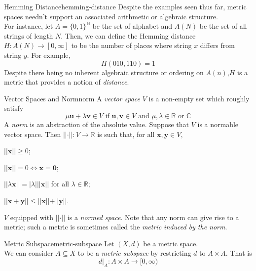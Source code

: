 \documentclass{article}
\renewcommand*\vec{\mathbf}
\numberwithin{equation}{section}
\numberwithin{figure}{section}
\newcommand*\setaxiomprefix[1]{
    \setlist[axioms]{label=#1\arabic*), ref=#1\arabic*}
}
\begin{document}
\begin{example}{Hemming Distance}{hemming-distance}
    Despite the examples seen thus far, metric spaces needn't support an
    associated arithmetic or algebraic structure.\\ For instance, let $ A =
    \{ 0, 1 \}^\mathbb{N} $ be the set of alphabet and $ A(N)$ be the set of all strings of length $N$. Then, we can define the Hemming distance $H : A(N) \rightarrow [0,\infty]$ to be the number of places where string $x$ differs from string $y$. For example,
    \begin{equation}
        H(010,110)=1
    \end{equation}
    Despite there being no inherent algebraic structure or ordering on $A(n)$,$H$ is a metric that provides a notion of \emph{distance}.
\end{example}
\begin{definition}{Vector Spaces and Norm}{norm}
    A \emph{vector space} $ V $ is a non-empty set which roughly satisfy 
    \begin{equation}
        \mu\vec{u} +\lambda\vec{v}\in V \text{ if } \vec{u},\vec{v} \in V \text{ and } \mu,\lambda\in \mathbb{R} \text{ or } \mathbb{C} 
    \end{equation}
    A \emph{norm} is an abstraction of the absolute value. Suppose that $ V $ is
    a normable vector space. Then $ \vert\vert\cdot\vert\vert \colon V \to
    \mathbb{R} $ is such that, for all $ \vec{x}, \vec{y} \in V $,
    \setaxiomprefix{N}
    \begin{axioms}
        \item $ \vert\vert \vec{x} \vert\vert \geq 0 $;
        \item $ \vert\vert \vec{x} \vert\vert = 0 \iff \vec{x} = \vec{0} $;
        \item $ \vert\vert \lambda \vec{x} \vert\vert = \vert \lambda \vert
            \vert\vert \vec{x} \vert\vert $ for all $ \lambda \in \mathbb{R} $;
        \item $ \vert\vert \vec{x} + \vec{y} \vert\vert \leq \vert\vert \vec{x}
            \vert\vert + \vert\vert \vec{y} \vert\vert $.
    \end{axioms}
    $ V $ equipped with $ \vert\vert \cdot \vert\vert $ is a \emph{normed
    space}. Note that any norm can give rise to a metric; such a metric is
    sometimes called the \emph{metric induced by the norm}.
\end{definition}
\begin{definition}{Metric Subspace}{metric-subspace}
    Let $(X,d)$ be a metric space.\\
    We can consider $A \subseteq X$ to be a \emph{metric subspace} by restricting $d$ to $A\times A$. That is
    \begin{equation}
        d\vert_A: A \times A \rightarrow [0,\infty)
    \end{equation}
\end{definition}
\end{document}
